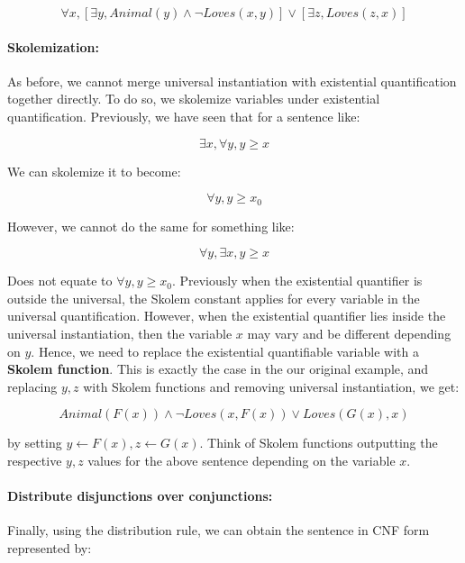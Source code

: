 \documentclass[12pt]{article}
\begin{document}
\begin{equation*}
\forall x, [\exists y, Animal(y) \land \lnot Loves(x, y)] \lor [\exists z, Loves(z, x)]
\end{equation*}

\paragraph{Skolemization:} As before, we cannot merge universal instantiation with existential quantification together directly. To do so, we skolemize variables under existential quantification. Previously, we have seen that for a sentence like:

\begin{equation*}
\exists x, \forall y, y \geq x
\end{equation*}

We can skolemize it to become:

\begin{equation*}
\forall y, y \geq x_0
\end{equation*}

However, we cannot do the same for something like:

\begin{equation*}
\forall y, \exists x, y \geq x
\end{equation*}

Does not equate to $\forall y, y \geq x_0$. Previously when the existential quantifier is outside the universal, the Skolem constant applies for every variable in the universal quantification. However, when the existential quantifier lies inside the universal instantiation, then the variable $x$ may vary and be different depending on $y$. Hence, we need to replace the existential quantifiable variable with a \textbf{Skolem function}. This is exactly the case in the our original example, and replacing $y, z$ with Skolem functions and removing universal instantiation, we get:

\begin{equation*}
Animal(F(x)) \land \lnot Loves(x, F(x)) \lor Loves(G(x), x)
\end{equation*}

by setting $y \leftarrow F(x), z \leftarrow G(x)$. Think of Skolem functions outputting the respective $y, z$ values for the above sentence depending on the variable $x$.

\paragraph{Distribute disjunctions over conjunctions:}
Finally, using the distribution rule, we can obtain the sentence in CNF form represented by:
\end{document}
